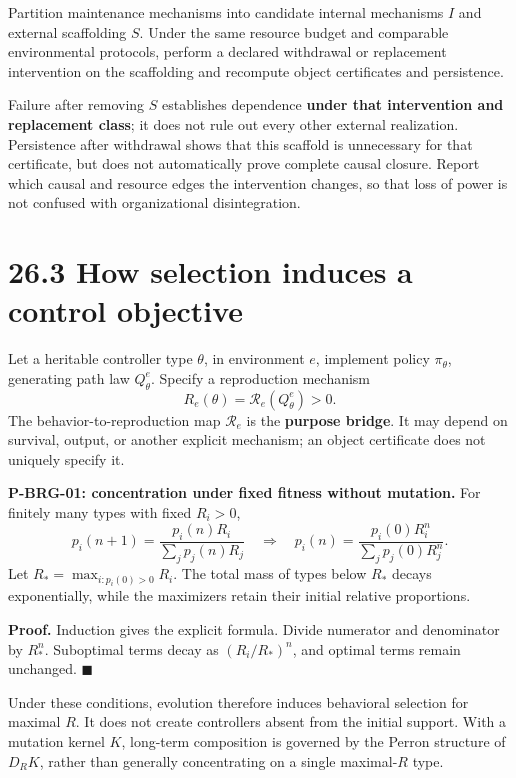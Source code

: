 \documentclass[
  english,
  11pt,
  oneside]{book}
\begin{document}
Partition maintenance mechanisms into candidate internal mechanisms \(I\) and external scaffolding \(S\). Under the same resource budget and comparable environmental protocols, perform a declared withdrawal or replacement intervention on the scaffolding and recompute object certificates and persistence.

Failure after removing \(S\) establishes dependence \textbf{under that intervention and replacement class}; it does not rule out every other external realization. Persistence after withdrawal shows that this scaffold is unnecessary for that certificate, but does not automatically prove complete causal closure. Report which causal and resource edges the intervention changes, so that loss of power is not confused with organizational disintegration.

\section{26.3 How selection induces a control objective}\label{how-selection-induces-a-control-objective}

Let a heritable controller type \(\theta\), in environment \(e\), implement policy \(\pi_\theta\), generating path law \(Q_\theta^e\). Specify a reproduction mechanism \[R_e(\theta)=\mathcal R_e(Q_\theta^e)>0.\] The behavior-to-reproduction map \(\mathcal R_e\) is the \textbf{purpose bridge}. It may depend on survival, output, or another explicit mechanism; an object certificate does not uniquely specify it.

\hypertarget{p-brg-01}{}\label{p-brg-01}

\textbf{P-BRG-01: concentration under fixed fitness without mutation.} For finitely many types with fixed \(R_i>0\), \[p_i(n+1)=\frac{p_i(n)R_i}{\sum_jp_j(n)R_j}
\quad\Longrightarrow\quad
p_i(n)=\frac{p_i(0)R_i^n}{\sum_jp_j(0)R_j^n}.\] Let \(R_*=\max_{i:p_i(0)>0}R_i\). The total mass of types below \(R_*\) decays exponentially, while the maximizers retain their initial relative proportions.

\textbf{Proof.} Induction gives the explicit formula. Divide numerator and denominator by \(R_*^n\). Suboptimal terms decay as \((R_i/R_*)^n\), and optimal terms remain unchanged. \(\blacksquare\)

Under these conditions, evolution therefore induces behavioral selection for maximal \(R\). It does not create controllers absent from the initial support. With a mutation kernel \(K\), long-term composition is governed by the Perron structure of \(D_RK\), rather than generally concentrating on a single maximal-\(R\) type.
\end{document}
